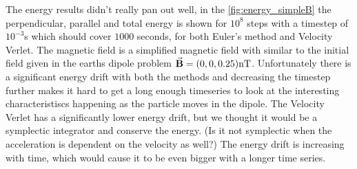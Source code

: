 \documentclass[x11names]{article}
\begin{document}
    The energy results didn't really pan out well, in the \cref{fig:energy_simpleB} the perpendicular, parallel and total energy is shown for \(10^8\) steps with a timestep of \(10^{-3}\)s which should cover \(1000\) seconds, for both Euler's method and Velocity Verlet. The magnetic field is a simplified magnetic field with similar to the initial field given in the earths dipole problem \(\va{B} = (0,0,0.25) \si{\nano\tesla}\). Unfortunately there is a significant energy drift with both the methods and decreasing the timestep further makes it hard to get a long enough timeseries to look at the interesting characteristiscs happening as the particle moves in the dipole.  The Velocity Verlet has a significantly lower energy drift, but we thought it would be a symplectic integrator and conserve the energy. (Is it not symplectic when the acceleration is dependent on the velocity as well?) The energy drift is increasing with time, which would cause it to be even bigger with a longer time series.
    \\ \\

    
\end{document}
